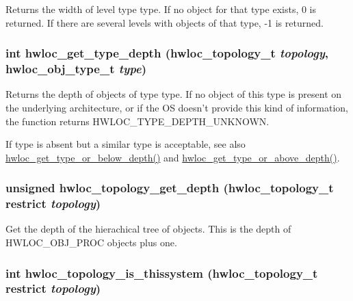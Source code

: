 Returns the width of level type {\ttfamily type}. If no object for that type exists, 0 is returned. If there are several levels with objects of that type, -\/1 is returned. \hypertarget{group__hwlocality__information_ga8bec782e21be313750da70cf7428b374}{
\subsubsection[{hwloc\_\-get\_\-type\_\-depth}]{\setlength{\rightskip}{0pt plus 5cm}int hwloc\_\-get\_\-type\_\-depth ({\bf hwloc\_\-topology\_\-t} {\em topology}, \/  {\bf hwloc\_\-obj\_\-type\_\-t} {\em type})}}
\label{group__hwlocality__information_ga8bec782e21be313750da70cf7428b374}


Returns the depth of objects of type {\ttfamily type}. If no object of this type is present on the underlying architecture, or if the OS doesn't provide this kind of information, the function returns HWLOC\_\-TYPE\_\-DEPTH\_\-UNKNOWN.

If type is absent but a similar type is acceptable, see also \hyperlink{group__hwlocality__helper__types_gaa0835c86ef2ce8c62637d61a1cf134f9}{hwloc\_\-get\_\-type\_\-or\_\-below\_\-depth()} and \hyperlink{group__hwlocality__helper__types_ga65a1d8f1012cb500817893ef848bc3f1}{hwloc\_\-get\_\-type\_\-or\_\-above\_\-depth()}. \hypertarget{group__hwlocality__information_ga3cc2255e237b751a6c8efa8703b3daf5}{
\subsubsection[{hwloc\_\-topology\_\-get\_\-depth}]{\setlength{\rightskip}{0pt plus 5cm}unsigned hwloc\_\-topology\_\-get\_\-depth ({\bf hwloc\_\-topology\_\-t} restrict {\em topology})}}
\label{group__hwlocality__information_ga3cc2255e237b751a6c8efa8703b3daf5}


Get the depth of the hierachical tree of objects. This is the depth of HWLOC\_\-OBJ\_\-PROC objects plus one. \hypertarget{group__hwlocality__information_ga29cdfde981aafc92eb89639a36b1ff9b}{
\subsubsection[{hwloc\_\-topology\_\-is\_\-thissystem}]{\setlength{\rightskip}{0pt plus 5cm}int hwloc\_\-topology\_\-is\_\-thissystem ({\bf hwloc\_\-topology\_\-t} restrict {\em topology})}}
\label{group__hwlocality__information_ga29cdfde981aafc92eb89639a36b1ff9b}


